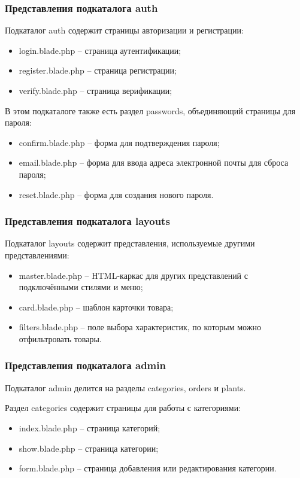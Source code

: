 \subsubsection{Представления подкаталога auth}
Подкаталог auth содержит страницы авторизации и регистрации:
\begin{itemize}
	\item login.blade.php – страница аутентификации;
	\item register.blade.php – страница регистрации;
	\item verify.blade.php – страница верификации;
\end{itemize}

В этом подкаталоге также есть раздел passwords, объединяющий страницы для пароля:
\begin{itemize}
	\item confirm.blade.php – форма для подтверждения пароля;
	\item email.blade.php – форма для ввода адреса электронной почты для сброса пароля;
	\item reset.blade.php – форма для создания нового пароля.
\end{itemize}

\subsubsection{Представления подкаталога layouts}
Подкаталог layouts содержит представления, используемые другими представлениями:
\begin{itemize}
	\item master.blade.php – HTML-каркас для других представлений с подключёнными стилями и меню;
	\item card.blade.php – шаблон карточки товара;
	\item filters.blade.php – поле выбора характеристик, по которым можно отфильтровать товары.
\end{itemize}

\subsubsection{Представления подкаталога admin}
Подкаталог admin делится на разделы categories, orders и plants. 

Раздел categories содержит страницы для работы с категориями:
\begin{itemize}
	\item index.blade.php – страница категорий;
	\item show.blade.php – страница категории;
	\item form.blade.php – страница добавления или редактирования категории.
\end{itemize}

